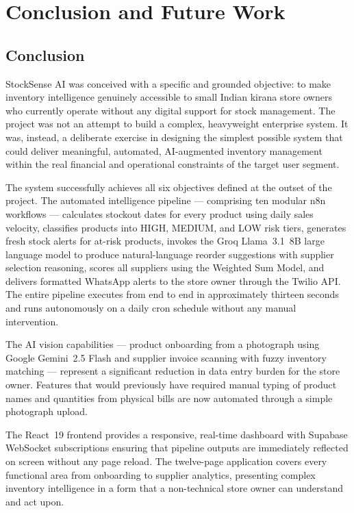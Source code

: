 \chapter{Conclusion and Future Work}
\label{ch:conclusion}

\section{Conclusion}

StockSense AI was conceived with a specific and grounded objective: to make inventory
intelligence genuinely accessible to small Indian kirana store owners who currently operate
without any digital support for stock management. The project was not an attempt to build
a complex, heavyweight enterprise system. It was, instead, a deliberate exercise in designing
the simplest possible system that could deliver meaningful, automated, AI-augmented inventory
management within the real financial and operational constraints of the target user segment.

The system successfully achieves all six objectives defined at the outset of the project.
The automated intelligence pipeline — comprising ten modular n8n workflows — calculates
stockout dates for every product using daily sales velocity, classifies products into HIGH,
MEDIUM, and LOW risk tiers, generates fresh stock alerts for at-risk products, invokes the
Groq Llama~3.1~8B large language model to produce natural-language reorder suggestions with
supplier selection reasoning, scores all suppliers using the Weighted Sum Model, and delivers
formatted WhatsApp alerts to the store owner through the Twilio API. The entire pipeline
executes from end to end in approximately thirteen seconds and runs autonomously on a daily
cron schedule without any manual intervention.

The AI vision capabilities — product onboarding from a photograph using Google Gemini~2.5
Flash and supplier invoice scanning with fuzzy inventory matching — represent a significant
reduction in data entry burden for the store owner. Features that would previously have
required manual typing of product names and quantities from physical bills are now automated
through a simple photograph upload.

The React~19 frontend provides a responsive, real-time dashboard with Supabase WebSocket
subscriptions ensuring that pipeline outputs are immediately reflected on screen without any
page reload. The twelve-page application covers every functional area from onboarding to
supplier analytics, presenting complex inventory intelligence in a form that a non-technical
store owner can understand and act upon.

